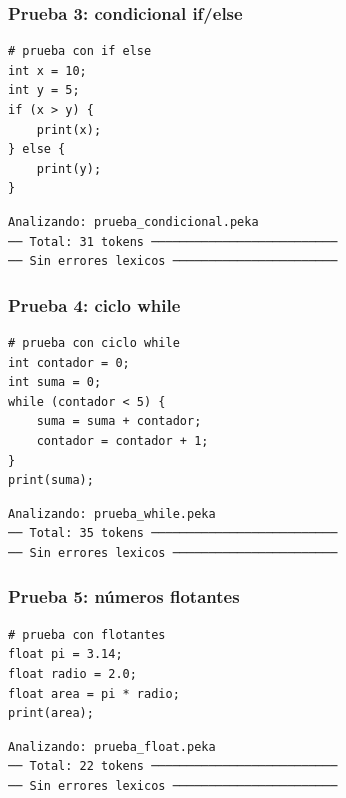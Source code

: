 \documentclass[12pt]{article}
\begin{document}
\subsubsection{Prueba 3: condicional if/else}

\begin{lstlisting}[caption={prueba\_condicional.peka}]
# prueba con if else
int x = 10;
int y = 5;
if (x > y) {
    print(x);
} else {
    print(y);
}
\end{lstlisting}

\begin{lstlisting}[caption={Salida — prueba\_condicional.peka}]
Analizando: prueba_condicional.peka
── Total: 31 tokens ──────────────────────────
── Sin errores lexicos ───────────────────────
\end{lstlisting}

\newpage
\subsubsection{Prueba 4: ciclo while}

\begin{lstlisting}[caption={prueba\_while.peka}]
# prueba con ciclo while
int contador = 0;
int suma = 0;
while (contador < 5) {
    suma = suma + contador;
    contador = contador + 1;
}
print(suma);
\end{lstlisting}

\begin{lstlisting}[caption={Salida — prueba\_while.peka}]
Analizando: prueba_while.peka
── Total: 35 tokens ──────────────────────────
── Sin errores lexicos ───────────────────────
\end{lstlisting}

\subsubsection{Prueba 5: números flotantes}

\begin{lstlisting}[caption={prueba\_float.peka}]
# prueba con flotantes
float pi = 3.14;
float radio = 2.0;
float area = pi * radio;
print(area);
\end{lstlisting}

\begin{lstlisting}[caption={Salida — prueba\_float.peka}]
Analizando: prueba_float.peka
── Total: 22 tokens ──────────────────────────
── Sin errores lexicos ───────────────────────
\end{lstlisting}
\end{document}
